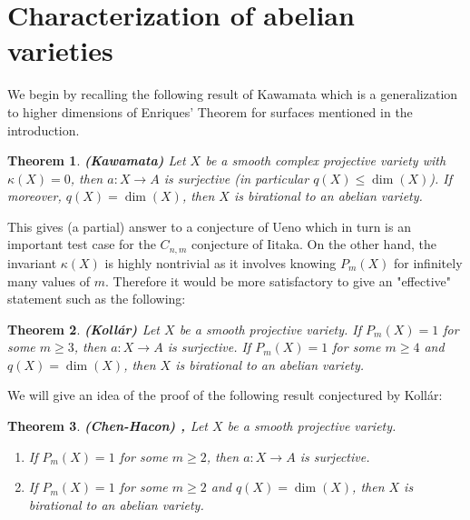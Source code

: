 \documentclass[10pt]{amsart}
\newtheorem{thm}{Theorem}[section]
\newcommand\alb{{ a}}
\newcommand\lra{\longrightarrow}
\newcommand\Alb{{ A}}
\begin{document}
\section{Characterization of abelian varieties} 
We begin by recalling the following result of 
Kawamata which is a generalization
to higher dimensions of Enriques' Theorem for surfaces 
mentioned in the introduction. 
\begin{thm}\label{kaw}
{\bf (Kawamata)} \cite{Ka1} Let $X$ be a smooth complex 
projective variety
with $\kappa (X)=0$, then $\alb :X\lra \Alb $ is surjective (in particular
$q(X)\leq \dim (X)$). If moreover, $q(X)=\dim (X)$, then
$X$ is birational to an abelian variety.
\end{thm}
This gives (a partial) answer to a conjecture of Ueno which in turn is
an important test case for the $C_{n,m}$ conjecture of Iitaka. On the other
hand, the invariant $\kappa (X)$ is highly nontrivial as it involves knowing
$P_m(X)$ for infinitely many values of $m$. 
Therefore it would be more satisfactory
to give an "effective" statement such as the following:
\begin{thm}\label{ko4} 
{\bf (Koll\'ar) \cite{Ko4}} Let $X$ be a smooth projective variety.
If $P_m(X)=1$ for some $m\geq 3$, then $\alb : X \lra \Alb $ is surjective.
If $P_m(X)=1$ for some $m\geq 4$ and $q(X)=\dim (X)$, then
$X$ is birational to an abelian variety.
\end{thm}
We will give an idea of the proof of the 
following result conjectured by Koll\'ar:
\begin{thm}\label{ch} {\bf (Chen-Hacon) \cite{CH1}, \cite{CH2}}
Let $X$ be a smooth projective variety.
\begin{enumerate}
\item If $P_m(X)=1$ for some $m\geq 2$, then $\alb : 
X \lra \Alb $ is surjective.
\item If $P_m(X)=1$ for some $m\geq 2$ and $q(X)=\dim (X)$,
then $X$ is birational to an abelian variety.
\end{enumerate}
\end{thm}
\end{document}
